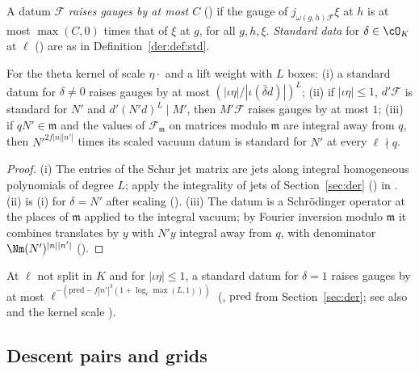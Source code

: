 A datum $\mathcal F$ \emph{raises gauges by at most $C$} () if the gauge of
$j_{\omega(g,h)\mathcal F}\xi$ at $h$ is at most $\max(C,0)$ times that of $\xi$ at $g$, for all $g,h,\xi$.
\emph{Standard data} for $\delta\in\cO_K$ at $\ell$ () are as in
Definition~\ref{der:def:std}.

\begin{proposition}
\label{ub-objects:prop:padic}
For the theta kernel of scale $\eta\cdot$ and a lift weight with $L$
boxes: (i) a standard datum for $\delta\ne0$ raises gauges by at most
$(|\iota\eta|/|\iota(\bar\delta d)|)^L$; (ii) if $|\iota\eta|\le1$, $d'\mathcal F$ is standard for $N'$ and
$d'(N'd)^L\mid M'$, then $M'\mathcal F$ raises gauges by at most $1$; (iii) if $qN'\in\mathfrak m$ and the
values of $\mathcal F_{\mathfrak m}$ on matrices modulo $\mathfrak m$ are integral away from $q$, then
$N'^{2f|n||n'|}$ times its scaled vacuum datum is standard for $N'$ at every $\ell\nmid q$.
\end{proposition}

\begin{proof}
(i) The entries of the Schur jet matrix are jets along integral homogeneous polynomials of degree
$L$; apply the integrality of jets of Section~\ref{sec:der}
() in
. (ii) is (i) for $\delta=N'$ after scaling
(). (iii) The datum is a Schr\"odinger operator at the places of
$\mathfrak m$ applied to the integral vacuum; by Fourier inversion modulo $\mathfrak m$ it combines
translates by $y$ with $N'y$ integral away from $q$, with denominator $\Nm(N')^{|n||n'|}$
().
\end{proof}

At $\ell$ not split in $K$ and for $|\iota\eta|\le1$, a standard datum for $\delta=1$ raises gauges by at most
$\ell^{-(\mathrm{pred}-f|n'|^3(1+\log_\ell\max(L,1)))}$ (,
$\mathrm{pred}$ from Section~\ref{sec:der}; see also 
and the kernel scale ).

\subsection{Descent pairs and grids}\label{ub-objects:sec:grids}

